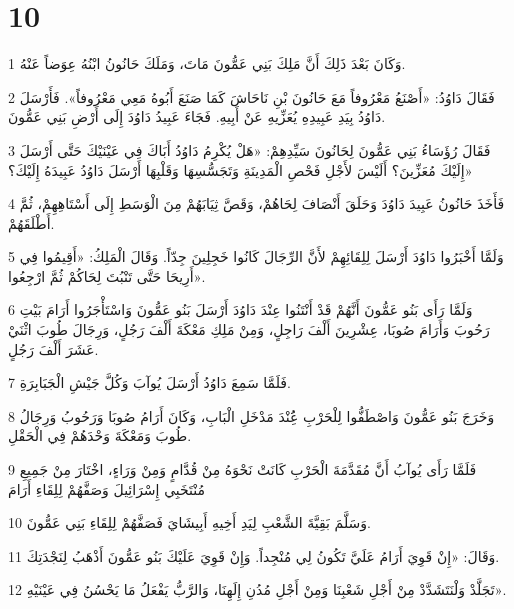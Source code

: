 \chapter{10}

\par 1 وَكَانَ بَعْدَ ذَلِكَ أَنَّ مَلِكَ بَنِي عَمُّونَ مَاتَ، وَمَلَكَ حَانُونُ ابْنُهُ عِوَضاً عَنْهُ.
\par 2 فَقَالَ دَاوُدُ: «أَصْنَعُ مَعْرُوفاً مَعَ حَانُونَ بْنِ نَاحَاشَ كَمَا صَنَعَ أَبُوهُ مَعِي مَعْرُوفاً». فَأَرْسَلَ دَاوُدُ بِيَدِ عَبِيدِهِ يُعَزِّيهِ عَنْ أَبِيهِ. فَجَاءَ عَبِيدُ دَاوُدَ إِلَى أَرْضِ بَنِي عَمُّونَ.
\par 3 فَقَالَ رُؤَسَاءُ بَنِي عَمُّونَ لِحَانُونَ سَيِّدِهِمْ: «هَلْ يُكْرِمُ دَاوُدُ أَبَاكَ فِي عَيْنَيْكَ حَتَّى أَرْسَلَ إِلَيْكَ مُعَزِّينَ؟ أَلَيْسَ لأَجْلِ فَحْصِ الْمَدِينَةِ وَتَجَسُّسِهَا وَقَلْبِهَا أَرْسَلَ دَاوُدُ عَبِيدَهُ إِلَيْكَ؟»
\par 4 فَأَخَذَ حَانُونُ عَبِيدَ دَاوُدَ وَحَلَقَ أَنْصَافَ لِحَاهُمْ، وَقَصَّ ثِيَابَهُمْ مِنَ الْوَسَطِ إِلَى أَسْتَاهِهِمْ، ثُمَّ أَطْلَقَهُمْ.
\par 5 وَلَمَّا أَخْبَرُوا دَاوُدَ أَرْسَلَ لِلِقَائِهِمْ لأَنَّ الرِّجَالَ كَانُوا خَجِلِينَ جِدّاً. وَقَالَ الْمَلِكُ: «أَقِيمُوا فِي أَرِيحَا حَتَّى تَنْبُتَ لِحَاكُمْ ثُمَّ ارْجِعُوا».
\par 6 وَلَمَّا رَأَى بَنُو عَمُّونَ أَنَّهُمْ قَدْ أَنْتَنُوا عِنْدَ دَاوُدَ أَرْسَلَ بَنُو عَمُّونَ وَاسْتَأْجَرُوا أَرَامَ بَيْتِ رَحُوبَ وَأَرَامَ صُوبَا، عِشْرِينَ أَلْفَ رَاجِلٍ، وَمِنْ مَلِكِ مَعْكَةَ أَلْفَ رَجُلٍ، وَرِجَالَ طُوبَ اثْنَيْ عَشَرَ أَلْفَ رَجُلٍ.
\par 7 فَلَمَّا سَمِعَ دَاوُدُ أَرْسَلَ يُوآبَ وَكُلَّ جَيْشِ الْجَبَابِرَةِ.
\par 8 وَخَرَجَ بَنُو عَمُّونَ وَاصْطَفُّوا لِلْحَرْبِ عَُِنْدَ مَدْخَلِ الْبَابِ، وَكَانَ أَرَامُ صُوبَا وَرَحُوبُ وَرِجَالُ طُوبَ وَمَعْكَةَ وَحْدَهُمْ فِي الْحَقْلِ.
\par 9 فَلَمَّا رَأَى يُوآبُ أَنَّ مُقَدَّمَةَ الْحَرْبِ كَانَتْ نَحْوَهُ مِنْ قُدَّامٍ وَمِنْ وَرَاءٍ، اخْتَارَ مِنْ جَمِيعِ مُنْتَخَبِي إِسْرَائِيلَ وَصَفَّهُمْ لِلِقَاءِ أَرَامَ
\par 10 وَسَلَّمَ بَقِيَّةَ الشَّعْبِ لِيَدِ أَخِيهِ أَبِيشَايَ فَصَفَّهُمْ لِلِقَاءِ بَنِي عَمُّونَ.
\par 11 وَقَالَ: «إِنْ قَوِيَ أَرَامُ عَلَيَّ تَكُونُ لِي مُنْجِداً. وَإِنْ قَوِيَ عَلَيْكَ بَنُو عَمُّونَ أَذْهَبُ لِنَجْدَتِكَ.
\par 12 تَجَلَّدْ وَلْنَتَشَدَّدْ مِنْ أَجْلِ شَعْبِنَا وَمِنْ أَجْلِ مُدُنِ إِلَهِنَا، وَالرَّبُّ يَفْعَلُ مَا يَحْسُنُ فِي عَيْنَيْهِ».
